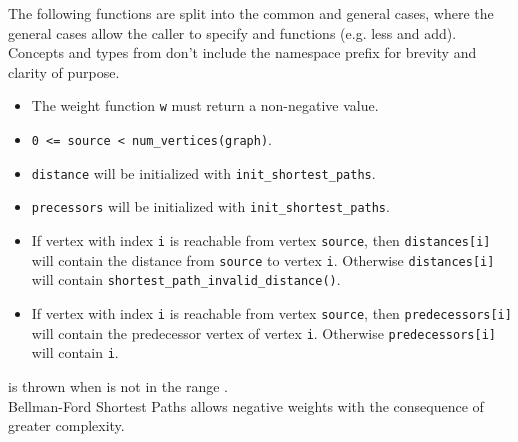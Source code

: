 The following functions are split into the common and general cases, where the general cases allow the caller
to specify  and  functions (e.g. less and add). Concepts and types from 
 don't include the namespace prefix for brevity and clarity of purpose.

{\small
      
      
}


\begin{itemdescr}
      \pnum\mandates
            \begin{itemize}
                  \item
                        The weight function \lstinline{w} must return a non-negative value.
            \end{itemize}
      \pnum\preconditions
            \begin{itemize}
                  \item
                        \lstinline{0 <= source < num_vertices(graph)}. 
                  \item
                        \lstinline{distance} will be initialized with \lstinline{init_shortest_paths}.
                  \item
                        \lstinline{precessors} will be initialized with \lstinline{init_shortest_paths}.
            \end{itemize}
      \pnum\effects
            \begin{itemize}
                  \item
                        If vertex with index \lstinline{i} is reachable from vertex \lstinline{source}, then
                        \lstinline{distances[i]} will contain the distance from \lstinline{source} to vertex
                        \lstinline{i}.  Otherwise \lstinline{distances[i]} will contain
                        \lstinline{shortest_path_invalid_distance()}.
                  \item
                        If vertex with index \lstinline{i} is reachable
                        from vertex \lstinline{source}, then \lstinline{predecessors[i]} will contain the
                        predecessor vertex of vertex \lstinline{i}. Otherwise \lstinline{predecessors[i]} will contain
                        \lstinline{i}.
            \end{itemize}
      \pnum\throws {} is thrown when  is not in the range .  \\
      \pnum\remarks 
                        Bellman-Ford Shortest Paths allows negative weights with the consequence of greater complexity. \\
\end{itemdescr}


